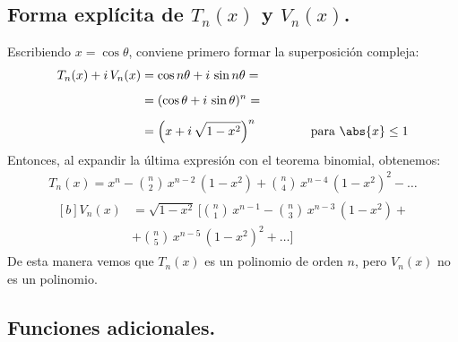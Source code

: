 \subsection{Forma explícita de \texorpdfstring{$T_{n}(x)$}{T(n)(x)} y \texorpdfstring{$V_{n}(x)$}{Vn(x)}.}

Escribiendo $x = \cos \theta$, conviene primero formar la superposición compleja:
\begin{align*}
T_{n}(x) + i \, V_{n} (x) &= \cos n \theta + i \, \sin n \theta = \\[0.5em]
&= (\cos \theta + i \, \sin \theta)^{n} = \\[0.5em]
&= \left( x + i \, \sqrt{1- x^{2}} \right)^{n} \hspace{1.5cm} \mbox{para  } \abs{x} \leq 1
\end{align*}
Entonces, al expandir la última expresión con el teorema binomial, obtenemos:
\begin{align}
T_{n}(x) = x^{n} - \binom{n}{2} \, x^{n-2} \, (1 - x^{2}) + \binom{n}{4} \, x^{n-4} \, (1 - x^{2})^{2} - \ldots \label{eq:ecuacion_18_056}
\end{align}
\begin{align}
\begin{aligned}[b]
V_{n}(x) &= \sqrt{1 - x^{2}} \, \bigg[ \binom{n}{1} \, x^{n-1} - \binom{n}{3} \, x^{n-3} \, (1- x^{2}) + \\[0.5em]
&+ \binom{n}{5} \, x^{n-5} \, (1- x^{2})^{2} + \ldots \bigg]
\end{aligned}
\label{eq:ecuacion_18_057}
\end{align}
De esta manera vemos que $T_{n}(x)$ es un polinomio de orden $n$, pero $V_{n}(x)$ no es un polinomio.

\subsection{Funciones adicionales.}

